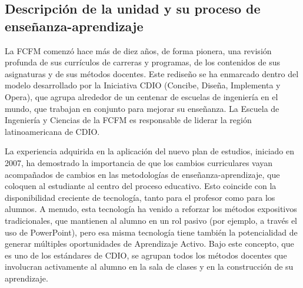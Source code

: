 \subsection{Descripción de la unidad y su proceso de enseñanza-aprendizaje}

La FCFM comenzó hace más de diez años, de forma pionera, una revisión profunda de sus
currículos de carreras y programas, de los contenidos de sus asignaturas y de sus métodos docentes.
Este rediseño se ha enmarcado dentro del modelo desarrollado por la Iniciativa CDIO (Concibe,
Diseña, Implementa y Opera), que agrupa alrededor de un centenar de escuelas de ingeniería en el
mundo, que trabajan en conjunto para mejorar su enseñanza. La Escuela de Ingeniería y Ciencias
de la FCFM es responsable de liderar la región latinoamericana de CDIO.

La experiencia adquirida en la aplicación del nuevo plan de estudios, iniciado en 2007, ha
demostrado la importancia de que los cambios curriculares vayan acompañados de cambios en las
metodologías de enseñanza-aprendizaje, que coloquen al estudiante al centro del proceso educativo.
Esto coincide con la disponibilidad creciente de tecnología, tanto para el profesor como para los
alumnos. A menudo, esta tecnología ha venido a reforzar los métodos expositivos tradicionales, que
mantienen al alumno en un rol pasivo (por ejemplo, a través el uso de PowerPoint), pero esa misma
tecnología tiene también la potencialidad de generar múltiples oportunidades de Aprendizaje
Activo. Bajo este concepto, que es uno de los estándares de CDIO, se agrupan todos los métodos
docentes que involucran activamente al alumno en la sala de clases y en la construcción de su
aprendizaje.


